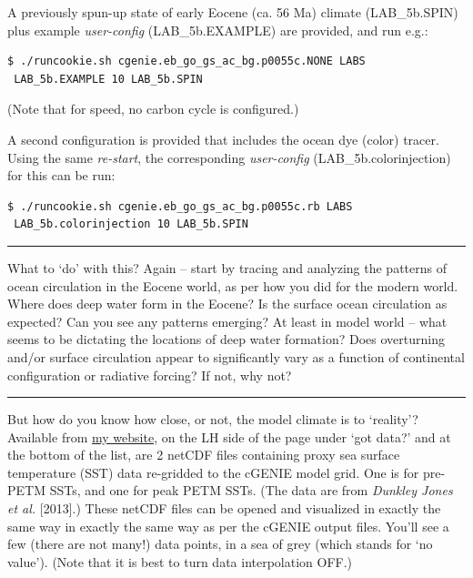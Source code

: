 A previously spun-up state of early Eocene   (ca. 56 Ma) climate (\textsf{\footnotesize LAB\_5b.SPIN}) plus example \textit{user-config} (\textsf{\footnotesize LAB\_5b.EXAMPLE}) are provided, and run e.g.:
\vspace{-1mm}\small\begin{verbatim}
$ ./runcookie.sh cgenie.eb_go_gs_ac_bg.p0055c.NONE LABS
 LAB_5b.EXAMPLE 10 LAB_5b.SPIN
\end{verbatim}\normalsize\vspace{-1mm}
(Note that for speed, no carbon cycle is configured.)

A second configuration is provided that includes the ocean dye (color) tracer. Using the same \textit{re-start}, the corresponding \textit{user-config} (\textsf{\footnotesize LAB\_5b.colorinjection}) for this can be run:
\vspace{-1mm}\small\begin{verbatim}
$ ./runcookie.sh cgenie.eb_go_gs_ac_bg.p0055c.rb LABS
 LAB_5b.colorinjection 10 LAB_5b.SPIN
\end{verbatim}\normalsize\vspace{-1mm}

\vspace{1mm}
\noindent\rule{4cm}{0.1mm}
\vspace{2mm}

\noindent What to ‘do’ with this? Again – start by tracing and analyzing the patterns of ocean circulation in the Eocene world, as per how you did for the modern world. Where does deep water form in the Eocene? Is the surface ocean circulation as expected?
Can you see any patterns emerging? At least in model world – what seems to be dictating the locations of deep water formation? Does overturning and/or surface circulation appear to significantly vary as a function of continental configuration or radiative forcing? If not, why not?

\vspace{1mm}
\noindent\rule{4cm}{0.1mm}
\vspace{2mm}

\noindent But how do you know how close, or not, the model climate is to ‘reality’?
Available from \href{https://www.seao2.info/mycookie.html}{my website}, on the LH side of the page under ‘got data?’ and at the bottom of the list, are 2 netCDF files containing proxy sea surface temperature (SST) data re-gridded to the cGENIE model grid. One is for pre-PETM SSTs, and one for peak PETM SSTs. (The data are from \textit{Dunkley Jones et al.} [2013].) 
These netCDF files can be opened and visualized in exactly the same way in exactly the same way as per the cGENIE output files. You’ll see a few (there are not many!) data points, in a sea of grey (which stands for ‘no value’). (Note that it is best to turn data interpolation OFF.)


